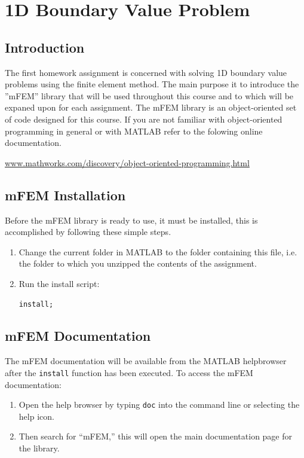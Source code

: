 \chapter{1D Boundary Value Problem}
\section*{Introduction}
The first homework assignment is concerned with solving 1D boundary value problems using the finite element method. The main purpose it to introduce the ''mFEM'' library that will be used throughout this course and to which will be expaned upon for each assignment. The mFEM library is an object-oriented set of code designed for this course. If you are not familiar with object-oriented programming in general or with MATLAB refer to the folowing online documentation. 
\begin{center}
\href{http://www.mathworks.com/discovery/object-oriented-programming.html}{www.mathworks.com/discovery/object-oriented-programming.html}
\end{center}

\section*{mFEM Installation}
Before the mFEM library is ready to use, it must be installed, this is accomplished by following these simple steps.
\begin{enumerate}
\item Change the current folder in MATLAB to the folder containing this file, i.e. the folder to which you unzipped the contents of the assignment.
\item Run the install script:
\begin{lstlisting}
install;
\end{lstlisting} 
\end{enumerate}
\section*{mFEM Documentation}
The mFEM documentation will be available from the MATLAB helpbrowser after the \texttt{install} function has been executed. To access the mFEM documentation:
\begin{enumerate}
\item Open the help browser by typing \texttt{doc} into the command line or selecting the help icon. 
\item Then search for ``mFEM,'' this will open the main documentation page for the library.
\end{enumerate}


